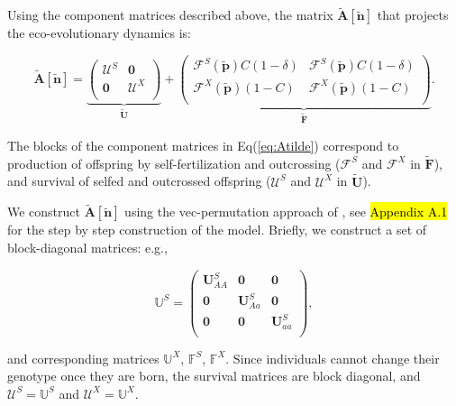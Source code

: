 \documentclass[11pt]{article}
\def\mbf#1{\mathbf{#1}}
\def\mbb#1{\mathbb{#1}}
\def\mcal#1{\mathcal{#1}}
\begin{document}
Using the component matrices described above, the matrix $\tilde{\mbf{A}}[\tilde{\mbf{n}}]$ that projects the eco-evolutionary dynamics is:
\begin{linenomath*}
\begin{equation} \label{eq:Atilde_appendix}
	\tilde{\mbf{A}}[\tilde{\mbf{n}}] = 
			\underbrace{\left(
			\begin{array}{c|c}
				\mcal{U}^S & \mbf{0} \\ \hline
				\mbf{0} & \mcal{U}^X \\
			\end{array} \right)}_{\tilde{\mbf{U}}} + 
			\underbrace{\left(
			\begin{array}{c|c}
				\mcal{F}^S(\tilde{\mbf{p}}) C(1 - \delta) & \mcal{F}^S(\tilde{\mbf{p}}) C(1 - \delta) \\ \hline
				\mcal{F}^X(\tilde{\mbf{p}}) (1 - C) & \mcal{F}^X(\tilde{\mbf{p}}) (1 - C)\\
			\end{array} \right)}_{\tilde{\mbf{F}}}.
\end{equation}
\end{linenomath*}

\noindent The blocks of the component matrices in Eq(\ref{eq:Atilde}) correspond to production of offspring by self-fertilization and outcrossing ($\mcal{F}^S$ and $\mcal{F}^X$ in $\tilde{\mbf{F}}$), and survival of selfed and outcrossed offspring ($\mcal{U}^S$ and $\mcal{U}^X$ in $\tilde{\mbf{U}}$). 

We construct $\tilde{\mbf{A}}[\tilde{\mbf{n}}]$ using the vec-permutation approach of \citet{CaswellEtAl2018}, see \hl{Appendix A.1} for the step by step construction of the model. Briefly, we construct a set of block-diagonal matrices: e.g.,
\begin{linenomath*}
\begin{equation} \label{eq:BlkUS_appendix}
	\mbb{U}^S = 
		\left(
			\begin{array}{ccc}
				\mbf{U}^{S}_{AA} & \mbf{0} & \mbf{0} \\
				\mbf{0} & \mbf{U}^{S}_{Aa} & \mbf{0} \\
				\mbf{0} & \mbf{0} & \mbf{U}^{S}_{aa} \\
			\end{array} \right),
\end{equation}
\end{linenomath*}

\noindent and corresponding matrices $\mbb{U}^X$, $\mbb{F}^S$, $\mbb{F}^X$. Since individuals cannot change their genotype once they are born, the survival matrices are block diagonal, and $\mcal{U}^S = \mbb{U}^S$ and $\mcal{U}^X = \mbb{U}^X$. 
\end{document}
